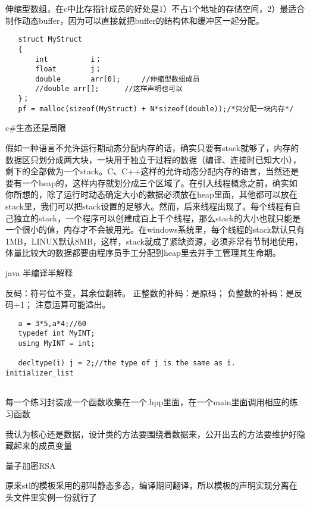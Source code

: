 \documentclass[UTF8]{article}
\begin{document}
伸缩型数组，在c中比存指针成员的好处是1）不占1个地址的存储空间，2）最适合制作动态buffer，因为可以直接就把buffer的结构体和缓冲区一起分配。
\begin{lstlisting}
   struct MyStruct
   {
       int			i；
       float		j；
       double		arr[0];		//伸缩型数组成员
       //double	arr[];		//这样声明也可以
   }；
   pf = malloc(sizeof(MyStruct) + N*sizeof(double));/*只分配一块内存*/
\end{lstlisting}
c\#生态还是局限


假如一种语言不允许运行期动态分配内存的话，确实只要有stack就够了，内存的数据区只划分成两大块，一块用于独立于过程的数据（编译、连接时已知大小），剩下的全部做为一个stack。C、C++这样的允许动态分配内存的语言，当然还是要有一个heap的，这样内存就划分成三个区域了。在引入线程概念之前，确实如你所想的，除了运行时动态确定大小的数据必须放在heap里面，其他都可以放在stack里，我们可以把stack设置的足够大。然而，后来线程出现了。每个线程有自己独立的stack，一个程序可以创建成百上千个线程，那么stack的大小也就只能是一个很小的值，内存才不会被用光。在windows系统里，每个线程的stack默认只有1MB，LINUX默认8MB，这样，stack就成了紧缺资源，必须非常有节制地使用，体量比较大的数据都要由程序员手工分配到heap里去并手工管理其生命期。

java 半编译半解释

反码：符号位不变，其余位翻转。
正整数的补码：是原码；
负整数的补码：是反码+1；
注意运算可能溢出。

\begin{lstlisting}
   a = 3*5,a*4;//60
   typedef int MyINT;
   using MyINT = int;

   decltype(i) j = 2;//the type of j is the same as i.
initializer_list


 \end{lstlisting}

 每一个练习封装成一个函数收集在一个.hpp里面，在一个main里面调用相应的练习函数

 我认为核心还是数据，设计类的方法要围绕着数据来，公开出去的方法要维护好隐藏起来的成员变量

 量子加密RSA

 原来stl的模板采用的那叫静态多态，编译期间翻译，所以模板的声明实现分离在头文件里实例一份就行了
\end{document}
